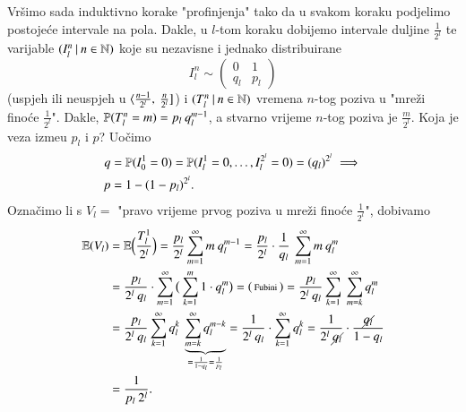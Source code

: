 \begin{pr}
    Vr\v simo sada induktivno korake "profinjenja" tako da u svakom koraku podjelimo postoje\' ce intervale na pola.
    Dakle, u $l$-tom koraku dobijemo intervale duljine $\frac{1}{2^l}$ te varijable $({I_l^n} \: | \: {n \in \mathbb{N}})$ koje su nezavisne i jednako distribuirane
    \begin{equation*}
        I_l^n \sim
        \begin{pmatrix}
            0 & 1 \\
            q_l & p_l
        \end{pmatrix}
    \end{equation*}
    (uspjeh ili neuspjeh u $\langle {\frac{n - 1}{2^l}}, \: {\frac{n}{2^l}}]$) i $({T_l^n} \: | \: {n \in \mathbb{N}})$ vremena $n$-tog poziva u "mre\v zi fino\' ce $\frac{1}{2^l}$".
    Dakle, $\mathbb{P}({T_l^n = m}) = p_l \: q_l^{m - 1}$, a stvarno vrijeme $n$-tog poziva je $\frac{m}{2^l}$.
    Koja je veza izme\dj u $p_l$ i $p$?
    Uo\v cimo
    \begin{equation*}
        \begin{aligned}
            q &= \mathbb{P}({I_0^1 = 0}) = \mathbb{P}({I_l^1 = 0, \ldots, I_l^{2^l} = 0}) = (q_l)^{2^l} \implies\\
            p &= 1 - (1 - p_l)^{2^l}.
        \end{aligned}
    \end{equation*}
    Ozna\v cimo li s $V_l =$ "pravo vrijeme prvog poziva u mre\v zi fino\' ce $\frac{1}{2^l}$", dobivamo
    \begin{equation*}
        \begin{aligned}
            \masE (V_l) &= \masE \Big(\frac{T_l^1}{2^l} \Big) = \frac{p_l}{2^l} \suma{m = 1}{\infty} m \: q_l^{m - 1} = \frac{p_l}{2^l} \cdot \frac{1}{q_l} \: \suma{m = 1}{\infty} m \: q_l^m\\
            &= \frac{p_l}{2^l \: q_l} \cdot \suma{m = 1}{\infty} \big( \suma{k = 1}{m} 1 \cdot q_l^m \big)=
            \begin{psmallmatrix}
                \textnormal{Fubini}
            \end{psmallmatrix}
            = \frac{p_l}{2^l \: q_l} \suma{k = 1}{\infty} \: \suma{m = k}{\infty} q_l^m\\
            &= \frac{p_l}{2^l \: q_l} \suma{k = 1}{\infty} q_l^k \: \underbrace{\suma{m = k}{\infty} q_l^{m - k}}_{= \frac{1}{1-q_l} = \frac{1}{p_l}} = \frac{1}{2^l \: q_l} \cdot \suma{k = 1}{\infty} q_l^k = \frac{1}{2^l \: \cancel{q_l}} \cdot \frac{\cancel{q_l}}{1 - q_l}\\
            &= \frac{1}{p_l \: 2^l}.

\end{aligned}
\end{equation*}
\end{pr}
